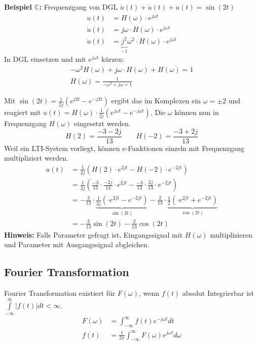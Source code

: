 \noindent\textbf{Beispiel $\mathbb{C}$:} Frequenzgang von DGL $\ddot{u}(t) + \dot{u}(t) + u(t) = \sin(2t)$\\
\begin{align*}
	u(t) &= H(\omega)\cdot e^{j\omega t} \\
	\dot{u}(t) &= j\omega \cdot H(\omega)\cdot e^{j\omega t} \\
	\ddot{u}(t) &= \underbrace{j^2}_{-1}\omega^2 \cdot H(\omega)\cdot e^{j\omega t} 
\end{align*}
In DGL einsetzen und mit $e^{j\omega t}$ kürzen:
\begin{align*}
		 -\omega^2H(\omega) +  j\omega \cdot H(\omega)+H(\omega) = 1 \\
		 H(\omega) = \frac{1}{-\omega^2 + j\omega + 1}
\end{align*}

\noindent Mit $\sin(2t) = \frac{1}{2j}\left(e^{j2t} - e^{-j2t}\right)$ ergibt das im Komplexen ein $\omega = \pm2$ und reagiert mit $u(t) = H(\omega)\cdot\frac{1}{2j}(e^{j\omega t} - e^{-j\omega t})$. Die $\omega$ können nun in Frequenzgang $H(\omega)$ eingesetzt werden.
\[
H(2) = \frac{-3 -2j}{13}\qquad H(-2)= \frac{-3 + 2j}{13}
\]
Weil ein LTI-System vorliegt, können e-Funktionen einzeln mit Frequenzgang multipliziert werden.
\begin{align*}
	u(t) &= \frac{1}{2j}\left(H(2)\cdot e^{2jt} - H(-2)\cdot e^{-2jt}\right) \\
	&= \frac{1}{2j}\left(\frac{-3}{13}\cdot\frac{-2j}{13}\cdot e^{2jt} - \frac{-3}{13}\cdot\frac{2j}{13}\cdot e^{-2jt} \right) \\
	&= -\frac{3}{13}\cdot \underbrace{\frac{1}{2j}\left(\cdot e^{2jt} - e^{-2jt} \right)}_{\sin(2t)} - \frac{2}{13}\cdot \underbrace{\frac{1}{2}\left(\cdot e^{2jt} + e^{-2jt}\right)}_{\cos(2t)}  \\
	&= -\frac{3}{13}\sin(2t) - \frac{2}{13}\cos(2t)
\end{align*} 
\textbf{Hinweis:} Falls Parameter gefragt ist, Eingangssignal mit $H(\omega)$ multiplizieren und Parameter mit Ausgangssignal abgleichen.


\subsection{Fourier Transformation}
Fourier Transformation existiert für $F(\omega)$, wenn $f(t)$ absolut Integrierbar ist $\int\limits_{-\infty}^{\infty}|f(t)|dt < \infty$.
\begin{align*}
	F(\omega) &= \int_{-\infty}^{\infty}f(t)e^{-j \omega t}dt \\
	f(t) &= \frac{1}{2\pi}\int_{-\infty}^{\infty}F(\omega)e^{j \omega t}d\omega
\end{align*}

